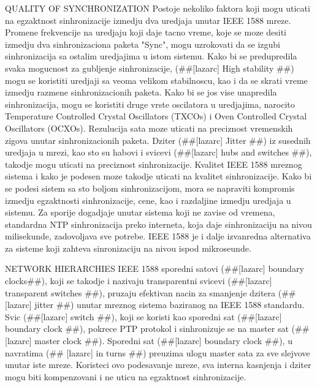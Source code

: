 \documentclass[a4paper,12pt, master]{etf}
\begin{document}
	QUALITY OF SYNCHRONIZATION
	Postoje nekoliko faktora koji mogu uticati na egzaktnost sinhronizacije izmedju dva 
	uredjaja unutar IEEE 1588 mreze. Promene frekvencije na uredjaju koji daje tacno vreme, 
	koje se moze desiti izmedju dva sinhronizaciona paketa "Sync", mogu uzrokovati da se 
	izgubi sinhronizacija sa ostalim uredjajima u istom sistemu. Kako bi se predupredila 
	svaka mogucnost za gubljenje sinhronizacije, (\#\#[lazarc] High stability \#\#) mogu se 
	koristiti uredjaji sa veoma velikom stabilnoscu, kao i da se skrati vreme izmedju razmene 
	sinhronizacionih paketa. Kako bi se jos vise unapredila sinhronizacija, mogu se koristiti 
	druge vrste oscilatora u uredjajima, narocito Temperature Controlled Crystal Oscillators 
	(TXCOs) i Oven Controlled Crystal Oscillators (OCXOs). Rezulucija sata moze uticati na 
	preciznost vremenskih zigova unutar sinhronizacionih paketa. Dziter (\#\#[lazarc] Jitter 
	\#\#) iz susednih uredjaja u mrezi, kao sto su habovi i svicevi (\#\#[lazarc] hubs and 
	switches \#\#), takodje mogu uticati na preciznost sinhronizacije. Kvalitet IEEE 1588 
	mreznog sistema i kako je podesen moze takodje uticati na kvalitet sinhronizacije. Kako bi 
	se podesi sistem sa sto boljom sinhronizacijom, mora se napraviti kompromis izmedju 
	egzaktnosti sinhronizacije, cene, kao i razdaljine izmedju uredjaja u sistemu. Za sporije 
	dogadjaje unutar sistema koji ne zavise od vremena, standardna NTP sinhronizacija preko 
	interneta, koja daje sinhronizaciju na nivou milisekunde, zadovoljava sve potrebe. IEEE 
	1588 je i dalje izvanredna alternativa za sisteme koji zahteva sinronizaciju na nivou ispod 
	mikroseunde.
	
	NETWORK HIERARCHIES
	IEEE 1588 sporedni satovi (\#\#[lazarc] boundary clocks\#\#), koji se takodje i nazivaju 
	transparentni svicevi (\#\#[lazarc] transparent switches \#\#), pruzaju efektivan nacin za 
	smanjenje dzitera (\#\#[lazarc] jitter \#\#) unutar mreznog sistema baziranog na IEEE 1588 
	standardu. Svic (\#\#[lazarc] switch \#\#), koji se koristi kao sporedni sat (\#\#[lazarc] 
	boundary clock \#\#), pokrece PTP protokol i sinhronizuje se na master sat (\#\#[lazarc] 
	master clock \#\#). Sporedni sat (\#\#[lazarc] boundary clock \#\#), u navratima (\#\#
	[lazarc] in turns \#\#) preuzima ulogu master sata za sve slejvove unutar iste mreze. 
	Koristeci ovo podesavanje mreze, sva interna kasnjenja i dziter mogu biti kompenzovani i ne 
	uticu na egzaktnost sinhronizacije.
	
\end{document}
